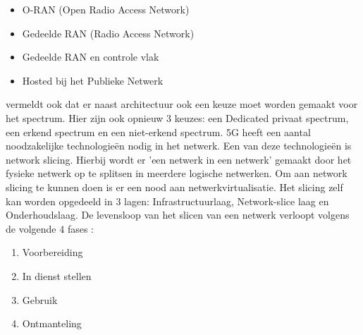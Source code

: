 \begin{itemize}
  \item O-RAN (Open Radio Access Network)
  \item Gedeelde RAN (Radio Access Network)
  \item Gedeelde RAN en controle vlak
  \item Hosted bij het Publieke Netwerk
\end{itemize}

\textcite{wen2021private} vermeldt ook dat er naast architectuur ook een keuze moet worden gemaakt voor het spectrum. Hier zijn ook opnieuw 3 keuzes: een Dedicated privaat spectrum, een erkend spectrum en een niet-erkend spectrum. 
5G heeft een aantal noodzakelijke technologieën nodig in het netwerk. Een van deze technologieën is network slicing. Hierbij wordt er 'een netwerk in een netwerk' gemaakt door het fysieke netwerk op te splitsen in meerdere logische netwerken. Om aan network slicing te kunnen doen is er een nood aan netwerkvirtualisatie. Het slicing zelf kan worden opgedeeld in 3 lagen: Infrastructuurlaag, Network-slice laag en Onderhoudslaag. De levensloop van het slicen van een netwerk verloopt volgens de volgende 4 fases \autocite{wen2021private}:

\begin{enumerate}
  \item Voorbereiding
  \item In dienst stellen
  \item Gebruik
  \item Ontmanteling
\end{enumerate}

